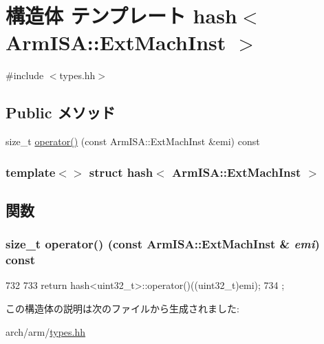 \hypertarget{structhash_3_01ArmISA_1_1ExtMachInst_01_4}{
\section{構造体 テンプレート hash$<$ ArmISA::ExtMachInst $>$}
\label{structhash_3_01ArmISA_1_1ExtMachInst_01_4}
}


{\ttfamily \#include $<$types.hh$>$}\subsection*{Public メソッド}
\begin{DoxyCompactItemize}
\item 
size\_\-t \hyperlink{structhash_3_01ArmISA_1_1ExtMachInst_01_4_a52c7a85b460e9e43561b2fc224315ea5}{operator()} (const ArmISA::ExtMachInst \&emi) const 
\end{DoxyCompactItemize}
\subsubsection*{template$<$$>$ struct hash$<$ ArmISA::ExtMachInst $>$}



\subsection{関数}
\hypertarget{structhash_3_01ArmISA_1_1ExtMachInst_01_4_a52c7a85b460e9e43561b2fc224315ea5}{
\subsubsection[{operator()}]{\setlength{\rightskip}{0pt plus 5cm}size\_\-t operator() (const ArmISA::ExtMachInst \& {\em emi}) const}}
\label{structhash_3_01ArmISA_1_1ExtMachInst_01_4_a52c7a85b460e9e43561b2fc224315ea5}



\begin{DoxyCode}
732                                                               {
733             return hash<uint32_t>::operator()((uint32_t)emi);
734         };
\end{DoxyCode}


この構造体の説明は次のファイルから生成されました:\begin{DoxyCompactItemize}
\item 
arch/arm/\hyperlink{arch_2arm_2types_8hh}{types.hh}\end{DoxyCompactItemize}

